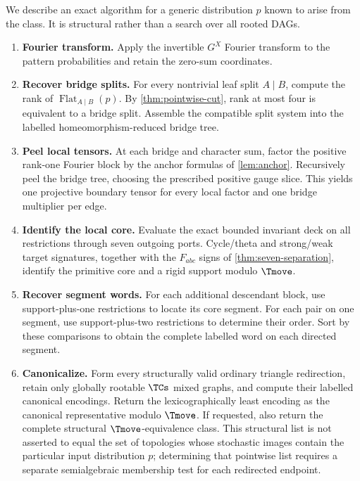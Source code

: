 We describe an exact algorithm for a generic distribution $p$ known to arise from the class.  It is structural rather than a search over all rooted DAGs.

\begin{enumerate}[label=\textbf{Step \arabic*.},leftmargin=2.2cm]
\item \textbf{Fourier transform.}  Apply the invertible $G^X$ Fourier transform to the pattern probabilities and retain the zero-sum coordinates.

\item \textbf{Recover bridge splits.}  For every nontrivial leaf split $A\mid B$, compute the rank of $\operatorname{Flat}_{A\mid B}(p)$.  By \cref{thm:pointwise-cut}, rank at most four is equivalent to a bridge split.  Assemble the compatible split system into the labelled homeomorphism-reduced bridge tree.

\item \textbf{Peel local tensors.}  At each bridge and character sum, factor the positive rank-one Fourier block by the anchor formulas of \cref{lem:anchor}.  Recursively peel the bridge tree, choosing the prescribed positive gauge slice.  This yields one projective boundary tensor for every local factor and one bridge multiplier per edge.

\item \textbf{Identify the local core.}  Evaluate the exact bounded invariant deck on all restrictions through seven outgoing ports.  Cycle/theta and strong/weak target signatures, together with the $F_{abc}$ signs of \cref{thm:seven-separation}, identify the primitive core and a rigid support modulo $\Tmove$.

\item \textbf{Recover segment words.}  For each additional descendant block, use support-plus-one restrictions to locate its core segment.  For each pair on one segment, use support-plus-two restrictions to determine their order.  Sort by these comparisons to obtain the complete labelled word on each directed segment.

\item \textbf{Canonicalize.}  Form every structurally valid ordinary triangle redirection, retain only globally rootable $\TCs$ mixed graphs, and compute their labelled canonical encodings.  Return the lexicographically least encoding as the canonical representative modulo $\Tmove$.  If requested, also return the complete structural $\Tmove$-equivalence class.  This structural list is not asserted to equal the set of topologies whose stochastic images contain the particular input distribution $p$; determining that pointwise list requires a separate semialgebraic membership test for each redirected endpoint.
\end{enumerate}

